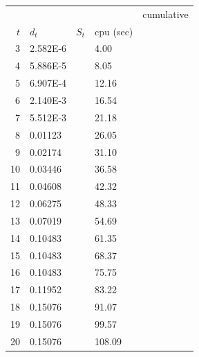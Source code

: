 \begin {tabular}{|rlllr|}
\hline
 &&&&  cumulative \\
   $t$ &      $d_t$  &      $S_t$  &  cpu (sec)\\
\hline
    3  &     2.582E-6 &             &      4.00 \\
    4  &     5.886E-5 &             &      8.05 \\
    5  &     6.907E-4 &             &     12.16 \\
    6  &     2.140E-3 &             &     16.54 \\
    7  &     5.512E-3 &             &     21.18 \\
    8  &      0.01123 &             &     26.05 \\
    9  &      0.02174 &             &     31.10 \\
   10  &      0.03446 &             &     36.58 \\
   11  &      0.04608 &             &     42.32 \\
   12  &      0.06275 &             &     48.33 \\
   13  &      0.07019 &             &     54.69 \\
   14  &      0.10483 &             &     61.35 \\
   15  &      0.10483 &             &     68.37 \\
   16  &      0.10483 &             &     75.75 \\
   17  &      0.11952 &             &     83.22 \\
   18  &      0.15076 &             &     91.07 \\
   19  &      0.15076 &             &     99.57 \\
   20  &      0.15076 &             &    108.09 \\
\hline
\end {tabular}
